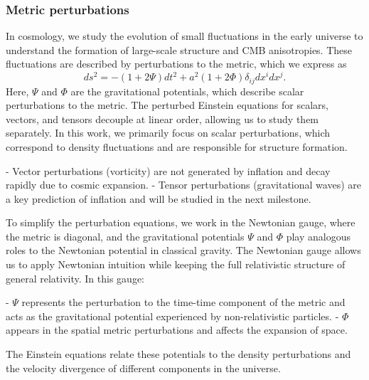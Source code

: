 \documentclass{aa}
\begin{document}



\subsubsection{Metric perturbations}
\color{Plum}
In cosmology, we study the evolution of small fluctuations in the early universe to understand the formation of large-scale structure and CMB anisotropies. These fluctuations are described by perturbations to the metric, which we express as  
\begin{equation}
ds^2 = - (1 + 2\Psi) dt^2 + a^2 (1 + 2\Phi) \delta_{ij} dx^i dx^j.
\end{equation}
Here, $\Psi$ and $\Phi$ are the gravitational potentials, which describe scalar perturbations to the metric. The perturbed Einstein equations for scalars, vectors, and tensors decouple at linear order, allowing us to study them separately. In this work, we primarily focus on scalar perturbations, which correspond to density fluctuations and are responsible for structure formation.  

- Vector perturbations (vorticity) are not generated by inflation and decay rapidly due to cosmic expansion.  
- Tensor perturbations (gravitational waves) are a key prediction of inflation and will be studied in the next milestone.  

To simplify the perturbation equations, we work in the Newtonian gauge, where the metric is diagonal, and the gravitational potentials $\Psi$ and $\Phi$ play analogous roles to the Newtonian potential in classical gravity. The Newtonian gauge allows us to apply Newtonian intuition while keeping the full relativistic structure of general relativity. In this gauge:  

- $\Psi$ represents the perturbation to the time-time component of the metric and acts as the gravitational potential experienced by non-relativistic particles.  
- $\Phi$ appears in the spatial metric perturbations and affects the expansion of space.  

The Einstein equations relate these potentials to the density perturbations and the velocity divergence of different components in the universe. 
\end{document}
